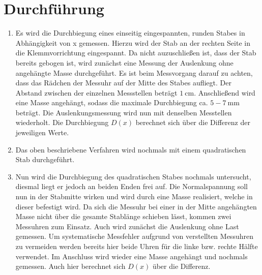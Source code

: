 
\section{Durchführung}
\label{sec:Durchführung}

\renewcommand{\labelenumi}{\alph{enumi})}
\begin{enumerate}
  \item Es wird die Durchbiegung eines einseitig eingespannten, runden Stabes in
   Abhängigkeit von x gemessen. Hierzu wird der Stab an der rechten Seite in die Klemmvorrichtung eingespannt.
   Da nicht auzuschließen ist, dass der Stab bereits gebogen ist, wird zunächst
    eine Messung der Auslenkung ohne angehängte Masse durchgeführt. Es ist beim
     Messvorgang darauf zu achten, dass das Rädchen der Messuhr auf der Mitte des Stabes aufliegt.
     Der Abstand zwischen der einzelnen Messstellen beträgt
     $\SI{1}{\centi\meter}$. Anschließend wird eine Masse angehängt, sodass
      die maximale Durchbiegung ca. $5-\SI{7}{\milli\meter}$ beträgt. Die Auslenkungsmessung
       wird nun mit denselben Messtellen wiederholt. Die Durchbiegung $D(x)$
       berechnet sich über die Differenz der jeweiligen Werte.

       \item Das oben beschriebene Verfahren wird nochmals mit einem
        quadratischen Stab durchgeführt.

        \item Nun wird die Durchbiegung des quadratischen Stabes nochmals untersucht, diesmal liegt er jedoch an beiden Enden frei auf.
         Die Normalspannung soll nun in der Stabmitte wirken und wird durch eine
          Masse realisiert, welche in dieser befestigt wird.
          Da sich die Messuhr bei einer in der Mitte angehängten Masse nicht
           über die gesamte Stablänge schieben lässt, kommen zwei Messuhren zum Einsatz.
           Auch wird zunächst die Auslenkung ohne Last gemessen.
            Um systematische Messfehler aufgrund von verstellten Messuhren zu vermeiden werden bereits hier
             beide Uhren für die linke bzw. rechte Hälfte verwendet. Im Anschluss
              wird wieder eine Masse angehängt und nochmals gemessen. Auch hier
               berechnet sich $D(x)$ über die Differenz.

\end{enumerate}
